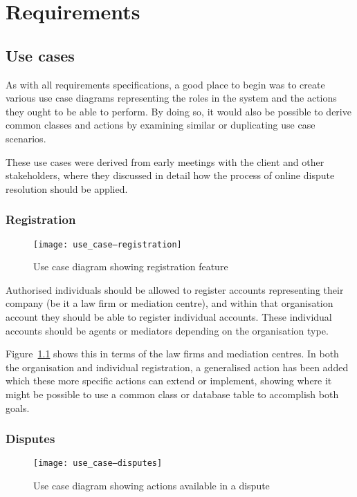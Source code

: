 \chapter{Requirements}

\section{Use cases}

As with all requirements specifications, a good place to begin was to create various use case diagrams representing the roles in the system and the actions they ought to be able to perform. By doing so, it would also be possible to derive common classes and actions by examining similar or duplicating use case scenarios.

These use cases were derived from early meetings with the client and other stakeholders, where they discussed in detail how the process of online dispute resolution should be applied.

\subsection{Registration}

\begin{figure}[h!]
  \centering
    \ifimages
    \texttt{[image: use\_case--registration]}
    \fi
  \caption{Use case diagram showing registration feature}
  \label{uml:useCase:registration}
\end{figure}

Authorised individuals should be allowed to register accounts representing their company (be it a law firm or mediation centre), and within that organisation account they should be able to register individual accounts. These individual accounts should be agents or mediators depending on the organisation type.

Figure~\ref{uml:useCase:registration} shows this in terms of the law firms and mediation centres. In both the organisation and individual registration, a generalised action has been added which these more specific actions can extend or implement, showing where it might be possible to use a common class or database table to accomplish both goals.

\subsection{Disputes}

\begin{figure}[h!]
  \centering
    \ifimages
    \texttt{[image: use\_case--disputes]}
    \fi
  \caption{Use case diagram showing actions available in a dispute}
  \label{uml:useCase:disputes}
\end{figure}

